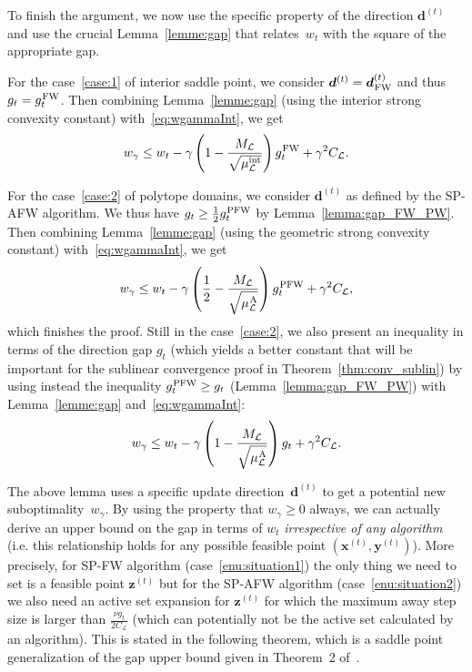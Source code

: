 \documentclass[twoside]{article}
\renewcommand{\L}{\mathcal{L}}
\newcommand{\xt}{\bm{x}^{(t)}}
\newcommand{\zt}{\bm{z}^{(t)}}
\newcommand{\dt}{\bm{d}^{(t)}}
\newcommand{\yt}{\bm{y}^{(t)}}
\newcommand{\wt}{w_t}
\newcommand{\gap}{g_{t}}
\newcommand{\CondNumb}{\nu}
\newcommand{\stepsize}{\gamma}
\newcommand{\FW}{{\hspace{0.05em}\textnormal{FW}}}
\newcommand{\PW}{{\hspace{0.05em}\textnormal{PFW}}}
\newcommand{\away}{{\hspace{0.05em}\textnormal{A}}}
\newcommand{\muIntL}{\mu^{\text{int}}_\L} %
\newcommand{\0}{\mathbf{0}} %
\begin{document}
  To finish the argument, we now use the specific property of the direction $\dt$ and use the crucial Lemma~\ref{lemme:gap} that relates~$w_t$ with the square of the appropriate gap.
  
  For the case~\eqref{case:1} of interior saddle point, we consider $\dt = \dt_{\FW}$ and thus $g_t = \gap^{\FW}$. Then combining Lemma~\ref{lemme:gap} (using the interior strong convexity constant) with~\eqref{eq:wgammaInt}, we get
      \begin{equation}\label{eq:int_strong_usual_gap}w_\gamma\leq  \wt - \gamma \left( 1 - \frac{M_\L}{\sqrt{\muIntL}}\right)\gap^{\FW}+ \gamma^2 C_\L.
      \end{equation}
      
    For the case~\eqref{case:2} of polytope domains, we consider $\dt$ as defined by the SP-AFW algorithm. We thus have $\gap \geq \frac{1}{2} \gap^{\PW}$ by Lemma~\ref{lemma:gap_FW_PW}. Then combining Lemma~\ref{lemme:gap} (using the geometric strong convexity constant) with~\eqref{eq:wgammaInt}, we get
      \begin{equation}\label{eq:geom_strong_pfw_gap}
      w_\gamma\leq  \wt - \gamma \left( \frac{1}{2} - \frac{M_\L}{\sqrt{\mu^{\away}_\L}}\right)\gap^{\PW}+ \gamma^2 C_\L ,
      \end{equation}
      which finishes the proof. Still in the case~\eqref{case:2}, we also present an inequality in terms of the direction gap $\gap$ (which yields a better constant that will be important for the sublinear convergence proof in Theorem~\ref{thm:conv_sublin}) by using instead the inequality $\gap^{\PW} \geq \gap$ (Lemma~\ref{lemma:gap_FW_PW}) with Lemma~\ref{lemme:gap} and~\eqref{eq:wgammaInt}:
      \begin{equation}\label{eq:geom_strong_gt_gap}
      w_\gamma\leq  \wt - \gamma \left( 1 - \frac{M_\L}{\sqrt{\mu^{\away}_\L}}\right)\gap + \gamma^2 C_\L.
      \end{equation}
  \endproof

The above lemma uses a specific update direction~$\dt$ to get a potential new suboptimality~$w_\stepsize$. By using the property that $w_\stepsize \geq 0$ always, we can actually derive an upper bound on the gap in terms of $w_t$ \emph{irrespective of any algorithm} (i.e. this relationship holds for any possible feasible point $(\xt,\yt)$). More precisely, for SP-FW algorithm (case~\eqref{enu:situation1}) the only thing we need to set is a feasible point $\zt$ but for the SP-AFW algorithm (case~\eqref{enu:situation2}) we also need an active set expansion for $\zt$ for which the maximum away step size is larger than $\frac{\CondNumb\gap}{2C_\L}$ (which can potentially not be the active set calculated by an algorithm). 
%
This is stated in the following theorem, which is a saddle point generalization of the gap upper bound given in Theorem~2 of~\citep{lacoste2015global}. 
\end{document}
